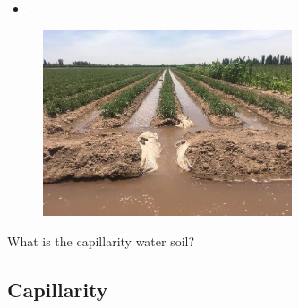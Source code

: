 \begin{frame}
	\frametitle{\secname}
	\begin{minipage}{0.5\textwidth}
		\begin{itemize}
			\item .
		\end{itemize}
	\end{minipage}
	\begin{minipage}{0.47\textwidth}
		\begin{figure}[ht!]
			\centering
			\includegraphics[height=5.5cm]{water_waster2}
		\end{figure}
	\end{minipage}
\end{frame}

\begin{frame}
	\begin{center}\Huge
		What is the capillarity water soil?
	\end{center}
\end{frame}

\subsection{Capillarity}

